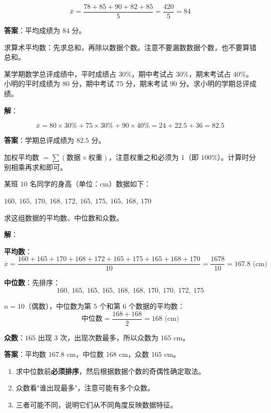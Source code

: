 \documentclass[12pt, a4paper]{ctexart}
\begin{document}
$$\bar{x} = \frac{78 + 85 + 90 + 82 + 85}{5} = \frac{420}{5} = 84$$

\textbf{答案}：平均成绩为 $84$ 分。

\begin{tipbox}[方法总结]
求算术平均数：先求总和，再除以数据个数。注意不要漏数数据个数，也不要算错总和。
\end{tipbox}

\begin{examplebox}
某学期数学总评成绩中，平时成绩占 $30\%$，期中考试占 $30\%$，期末考试占 $40\%$。小明的平时成绩为 $80$ 分，期中考试 $75$ 分，期末考试 $90$ 分。求小明的学期总评成绩。
\end{examplebox}

\textbf{解}：

$$\bar{x} = 80 \times 30\% + 75 \times 30\% + 90 \times 40\% = 24 + 22.5 + 36 = 82.5$$

\textbf{答案}：学期总评成绩为 $82.5$ 分。

\begin{tipbox}[方法总结]
加权平均数 $= \sum(\text{数据} \times \text{权重})$，注意权重之和必须为 $1$（即 $100\%$）。计算时分别相乘再求和即可。
\end{tipbox}

\begin{examplebox}
某班 $10$ 名同学的身高（单位：cm）数据如下：

$160,\ 165,\ 170,\ 168,\ 172,\ 165,\ 175,\ 165,\ 168,\ 170$

求这组数据的平均数、中位数和众数。
\end{examplebox}

\textbf{解}：

\textbf{平均数}：
$$\bar{x} = \frac{160+165+170+168+172+165+175+165+168+170}{10} = \frac{1678}{10} = 167.8 \text{ (cm)}$$

\textbf{中位数}：先排序：
$$160,\ 165,\ 165,\ 165,\ 168,\ 168,\ 170,\ 170,\ 172,\ 175$$

$n = 10$（偶数），中位数为第 $5$ 个和第 $6$ 个数据的平均数：
$$\text{中位数} = \frac{168 + 168}{2} = 168 \text{ (cm)}$$

\textbf{众数}：$165$ 出现 $3$ 次，出现次数最多，所以众数为 $165$ cm。

\textbf{答案}：平均数 $167.8$ cm，中位数 $168$ cm，众数 $165$ cm。

\begin{tipbox}[方法总结]
\begin{enumerate}[leftmargin=2em]
  \item 求中位数前\textbf{必须排序}，然后根据数据个数的奇偶性确定取法。
  \item 众数看"谁出现最多"，注意可能有多个众数。
  \item 三者可能不同，说明它们从不同角度反映数据特征。
\end{enumerate}
\end{tipbox}
\end{document}
